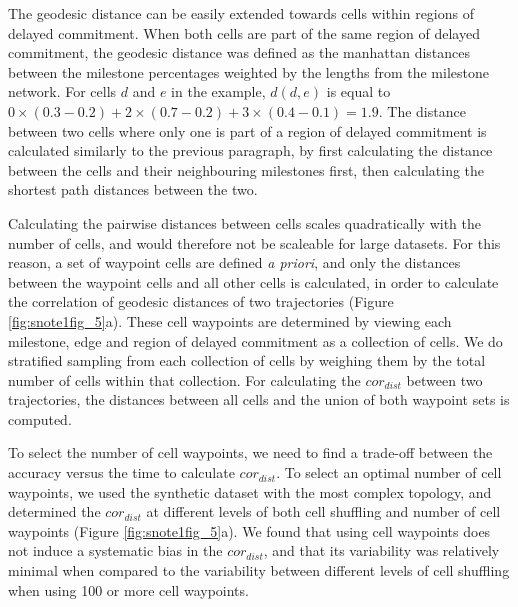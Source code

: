The geodesic distance can be easily extended towards cells within regions of delayed commitment. When both cells are part of the same region of delayed commitment, the geodesic distance was defined as the manhattan distances between the milestone percentages weighted by the lengths from the milestone network. For cells $d$ and $e$ in the example, $d(d, e)$ is equal to $0 \times (0.3 - 0.2) + 2 \times (0.7 - 0.2) + 3 \times(0.4 - 0.1) = 1.9$. The distance between two cells where only one is part of a region of delayed commitment is calculated similarly to the previous paragraph, by first calculating the distance between the cells and their neighbouring milestones first, then calculating the shortest path distances between the two.

Calculating the pairwise distances between cells scales quadratically with the number of cells, and would therefore not be scaleable for large datasets. For this reason, a set of waypoint cells are defined \textit{a priori}, and only the distances between the waypoint cells and all other cells is calculated, in order to calculate the correlation of geodesic distances of two trajectories (Figure \ref{fig:snote1fig_5}a). These cell waypoints are determined by viewing each milestone, edge and region of delayed commitment as a collection of cells. We do stratified sampling from each collection of cells by weighing them by the total number of cells within that collection. For calculating the $\textit{cor}_{\textit{dist}}$ between two trajectories, the distances between all cells and the union of both waypoint sets is computed.

To select the number of cell waypoints, we need to find a trade-off between the accuracy versus the time to calculate $\textit{cor}_{\textit{dist}}$. To select an optimal number of cell waypoints, we used the synthetic dataset with the most complex topology, and determined the $\textit{cor}_{\textit{dist}}$ at different levels of both cell shuffling and number of cell waypoints (Figure \ref{fig:snote1fig_5}a). We found that using cell waypoints does not induce a systematic bias in the $\textit{cor}_{\textit{dist}}$, and that its variability was relatively minimal when compared to the variability between different levels of cell shuffling when using 100 or more cell waypoints.

